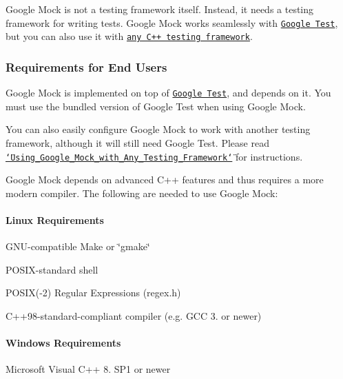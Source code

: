 Google Mock is not a testing framework itself. Instead, it needs a testing framework for writing tests. Google Mock works seamlessly with \href{https://github.com/google/googletest}{\tt Google Test}, but you can also use it with \href{../../master/googlemock/docs/ForDummies.md#using-google-mock-with-any-testing-framework}{\tt any C++ testing framework}.

\subsubsection*{Requirements for End Users}

Google Mock is implemented on top of \href{http://github.com/google/googletest/}{\tt Google Test}, and depends on it. You must use the bundled version of Google Test when using Google Mock.

You can also easily configure Google Mock to work with another testing framework, although it will still need Google Test. Please read \href{../../master/googlemock/docs/ForDummies.md#using-google-mock-with-any-testing-framework}{\tt \char`\"{}\+Using\+\_\+\+Google\+\_\+\+Mock\+\_\+with\+\_\+\+Any\+\_\+\+Testing\+\_\+\+Framework\char`\"{}} for instructions.

Google Mock depends on advanced C++ features and thus requires a more modern compiler. The following are needed to use Google Mock\+:

\paragraph*{Linux Requirements}


\begin{DoxyItemize}
\item G\+NU-\/compatible Make or \char`\"{}gmake\char`\"{}
\item P\+O\+S\+IX-\/standard shell
\item P\+O\+S\+IX(-\/2) Regular Expressions (regex.\+h)
\item C++98-\/standard-\/compliant compiler (e.\+g. G\+CC 3. or newer)
\end{DoxyItemize}

\paragraph*{Windows Requirements}


\begin{DoxyItemize}
\item Microsoft Visual C++ 8. S\+P1 or newer
\end{DoxyItemize}

